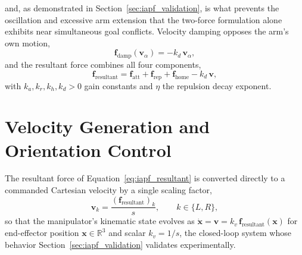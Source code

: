 and, as demonstrated in Section~\ref{sec:iapf_validation}, is what prevents the oscillation and
excessive arm extension that the two-force formulation alone exhibits near simultaneous goal
conflicts. Velocity damping opposes the arm's own motion,
\begin{equation}
\mathbf{f}_{\text{damp}}(\mathbf{v}_\alpha) = -k_d\, \mathbf{v}_\alpha,
\label{eq:iapf_damp}
\end{equation}
and the resultant force combines all four components,
\begin{equation}
\mathbf{f}_{\text{resultant}} = \mathbf{f}_{\text{att}} + \mathbf{f}_{\text{rep}} + \mathbf{f}_{\text{home}}
- k_d\, \mathbf{v},
\label{eq:iapf_resultant}
\end{equation}
with $k_a, k_r, k_h, k_d > 0$ gain constants and $\eta$ the repulsion decay exponent.

\section{Velocity Generation and Orientation Control}\label{sec:iapf_velocity}

The resultant force of Equation~\eqref{eq:iapf_resultant} is converted directly to a commanded
Cartesian velocity by a single scaling factor,
\begin{equation}
\mathbf{v}_k = \frac{\left(\mathbf{f}_{\text{resultant}}\right)_k}{s}, \qquad k \in \{L, R\},
\label{eq:iapf_velocity}
\end{equation}
so that the manipulator's kinematic state evolves as $\dot{\mathbf{x}} = \mathbf{v} = k_v\, \mathbf{f}_{\text{resultant}}(\mathbf{x})$
for end-effector position $\mathbf{x} \in \mathbb{R}^3$ and scalar $k_v = 1/s$, the closed-loop system whose
behavior Section~\ref{sec:iapf_validation} validates experimentally.

